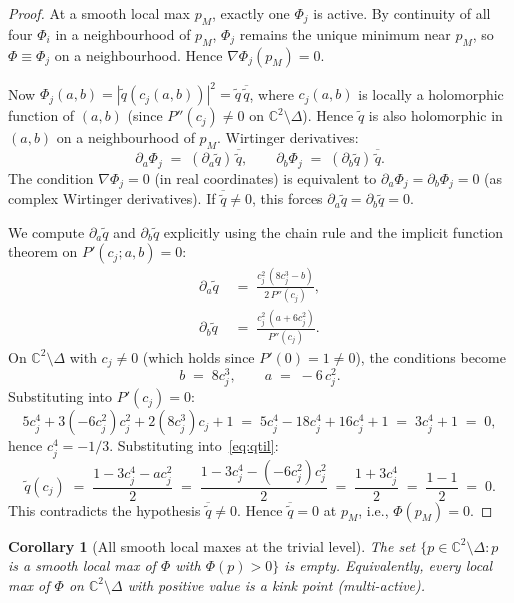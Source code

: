 \documentclass[11pt,a4paper]{article}
\newtheorem{corollary}[theorem]{Corollary}
\begin{document}
\begin{proof}
At a smooth local max $p_M$, exactly one $\Phi_j$ is active. By
continuity of all four $\Phi_i$ in a neighbourhood of $p_M$, $\Phi_j$
remains the unique minimum near $p_M$, so $\Phi\equiv\Phi_j$ on a
neighbourhood. Hence $\nabla\Phi_j(p_M)=0$.

Now $\Phi_j(a,b) = |\widetilde q(c_j(a,b))|^2 = \widetilde q\,
\overline{\widetilde q}$, where $c_j(a,b)$ is locally a holomorphic
function of $(a,b)$ (since $P''(c_j)\neq 0$ on $\mathbb{C}^2\setminus\Delta$).
Hence $\widetilde q$ is also holomorphic in $(a,b)$ on a neighbourhood
of $p_M$. Wirtinger derivatives:
\begin{equation}
\partial_a\Phi_j \;=\; (\partial_a\widetilde q)\,\overline{\widetilde q},
\qquad
\partial_b\Phi_j \;=\; (\partial_b\widetilde q)\,\overline{\widetilde q}.
\end{equation}
The condition $\nabla\Phi_j=0$ (in real coordinates) is equivalent to
$\partial_a\Phi_j = \partial_b\Phi_j = 0$ (as complex Wirtinger
derivatives). If $\overline{\widetilde q}\neq 0$, this forces
$\partial_a\widetilde q = \partial_b\widetilde q = 0$.

We compute $\partial_a\widetilde q$ and $\partial_b\widetilde q$
explicitly using the chain rule and the implicit function theorem on
$P'(c_j;a,b)=0$:
\begin{align}
\partial_a\widetilde q &\;=\; \frac{c_j^2\,(8c_j^3 - b)}{2\,P''(c_j)},\\
\partial_b\widetilde q &\;=\; \frac{c_j^2\,(a + 6c_j^2)}{P''(c_j)}.
\end{align}
On $\mathbb{C}^2\setminus\Delta$ with $c_j\neq 0$ (which holds since
$P'(0)=1\neq 0$), the conditions become
\begin{equation}
b \;=\; 8 c_j^3,
\qquad
a \;=\; -6\,c_j^2.
\end{equation}
Substituting into $P'(c_j)=0$:
\[
5 c_j^4 + 3(-6c_j^2)c_j^2 + 2(8c_j^3)c_j + 1
\;=\; 5c_j^4 - 18c_j^4 + 16c_j^4 + 1 \;=\; 3c_j^4 + 1 \;=\; 0,
\]
hence $c_j^4 = -1/3$. Substituting into~\eqref{eq:qtil}:
\[
\widetilde q(c_j) \;=\; \frac{1 - 3c_j^4 - a c_j^2}{2}
\;=\; \frac{1 - 3c_j^4 - (-6c_j^2)c_j^2}{2}
\;=\; \frac{1 + 3c_j^4}{2}
\;=\; \frac{1 - 1}{2} \;=\; 0.
\]
This contradicts the hypothesis $\overline{\widetilde q}\neq 0$.
Hence $\overline{\widetilde q} = 0$ at $p_M$, i.e., $\Phi(p_M)=0$.
\end{proof}

\begin{corollary}[All smooth local maxes at the trivial level]
The set $\{p\in\mathbb{C}^2\setminus\Delta : p$ is a smooth local
max of $\Phi$ with $\Phi(p)>0\}$ is empty. Equivalently, every local
max of $\Phi$ on $\mathbb{C}^2\setminus\Delta$ with positive value is
a kink point (multi-active).
\end{corollary}
\end{document}
